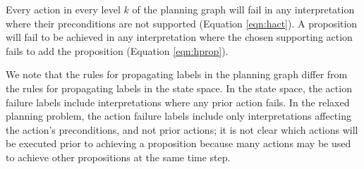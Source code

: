 \documentclass{article}
\begin{document}
\noindent 
Every action in every level $k$ of the planning graph will fail in any interpretation where their preconditions are not supported (Equation \ref{eqn:hact}).  A proposition will fail to be achieved in any interpretation where the chosen supporting action fails to add the proposition (Equation \ref{eqn:hprop}).

We note that the rules for propagating labels in the planning graph differ from the rules for propagating labels in the state space.  In the state space, the action failure labels include interpretations where any prior action fails.  In the relaxed planning problem, the action failure labels include only interpretations affecting the action's preconditions, and not prior actions; it is not clear which actions will be executed prior to achieving a proposition because many actions may be used to achieve other propositions at the same time step.  
\end{document}
